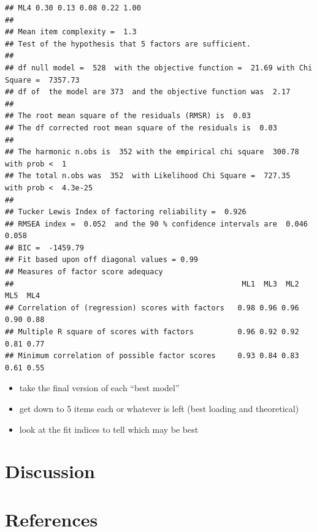 \documentclass[
  man]{apa6}
\providecommand{\tightlist}{%
  \setlength{\itemsep}{0pt}\setlength{\parskip}{0pt}}
\begin{document}
\begin{verbatim}
## ML4 0.30 0.13 0.08 0.22 1.00
## 
## Mean item complexity =  1.3
## Test of the hypothesis that 5 factors are sufficient.
## 
## df null model =  528  with the objective function =  21.69 with Chi Square =  7357.73
## df of  the model are 373  and the objective function was  2.17 
## 
## The root mean square of the residuals (RMSR) is  0.03 
## The df corrected root mean square of the residuals is  0.03 
## 
## The harmonic n.obs is  352 with the empirical chi square  300.78  with prob <  1 
## The total n.obs was  352  with Likelihood Chi Square =  727.35  with prob <  4.3e-25 
## 
## Tucker Lewis Index of factoring reliability =  0.926
## RMSEA index =  0.052  and the 90 % confidence intervals are  0.046 0.058
## BIC =  -1459.79
## Fit based upon off diagonal values = 0.99
## Measures of factor score adequacy             
##                                                    ML1  ML3  ML2  ML5  ML4
## Correlation of (regression) scores with factors   0.98 0.96 0.96 0.90 0.88
## Multiple R square of scores with factors          0.96 0.92 0.92 0.81 0.77
## Minimum correlation of possible factor scores     0.93 0.84 0.83 0.61 0.55
\end{verbatim}

\begin{itemize}
\tightlist
\item
  take the final version of each ``best model''
\item
  get down to 5 items each or whatever is left (best loading and
  theoretical)
\item
  look at the fit indices to tell which may be best
\end{itemize}

\section{Discussion}\label{discussion}

\newpage

\section{References}\label{references}
\end{document}
